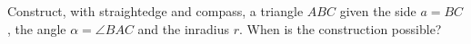 Construct, with straightedge and compass, a triangle $ABC$ given the side $a=BC$, the angle $\alpha=\angle BAC$ and the inradius $r$. When is the construction possible?
